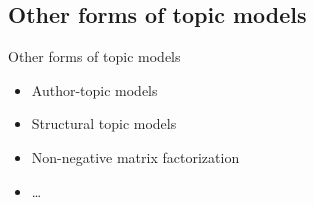 \subsection{Other forms of topic models}

\begin{frame}{Other forms of topic models}
\begin{itemize}
\item Author-topic models
\item Structural topic models
\item Non-negative matrix factorization
\item \ldots
\end{itemize}
\end{frame}




